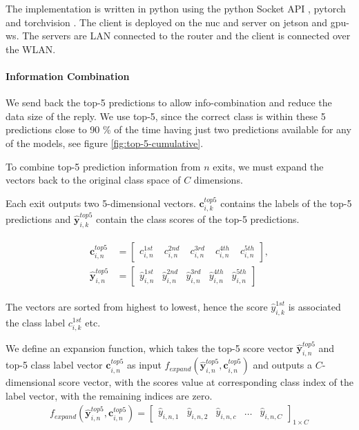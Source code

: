 The implementation is written in \gls{python} using the \gls{python} Socket API \cite{noauthor_socket_nodate}, \gls{pytorch} \cite{paszke_automatic_2017} and \gls{torchvision} \cite{marcel_torchvision_2010}. The client is deployed on the \gls{nuc} and server on \gls{jetson} and \gls{gpu-ws}. The servers are LAN connected to the router and the client is connected over the WLAN.

\paragraph{Information Combination}

We send back the top-5 predictions to allow info-combination and reduce the data size of the reply. We use top-5, since the correct class is within these 5 predictions close to 90 \% of the time having just two predictions available for any of the models, see figure \ref{fig:top-5-cumulative}.

To combine top-5 prediction information from $ n $ exits, we must expand the vectors back to the original class space of $ C $ dimensions.

Each exit outputs two 5-dimensional vectors. $\mathbf{c}_{i,k}^{top5}$ contains the labels of the top-5 predictions and $ \mathbf{\hat{y}}_{i,k}^{top5}$ contain the class scores of the top-5 predictions. 

\begin{align}
\begin{split}
\mathbf{c}_{i,n}^{top5} &= \begin{bmatrix}
c_{i,n}^{1st} & \phantom{.}c_{i,n}^{2nd} & \phantom{.}c_{i,n}^{3rd} & \phantom{.}c_{i,n}^{4th} & \phantom{.}c_{i,n}^{5th}
\end{bmatrix}, \\
\mathbf{\hat{y}}^{top5}_{i,n} &= \begin{bmatrix}
\hat{y}_{i,n}^{1st} & \hat{y}_{i,n}^{2nd} & \hat{y}_{i,n}^{3rd} & \hat{y}_{i,n}^{4th} & \hat{y}_{i,n}^{5th}
\end{bmatrix}
\end{split}
\end{align}

The vectors are sorted from highest to lowest, hence the score $ \hat{y}_{i,k}^{1st} $ is associated the class label $ c_{i,k}^{1st} $ etc. 

We define an expansion function, which takes the top-5 score vector $ \mathbf{\hat{y}}_{i,n}^{top5}$ and top-5 class label vector  $\mathbf{c}_{i,n}^{top5}$ as input  $ f_{expand}\left(\bm{\hat{y}}_{i,n}^{top5},\mathbf{c}_{i,n}^{top5}\right) $ and outputs a $ C $-dimensional score vector, with the scores value at corresponding class index of the label vector, with the remaining indices are zero.
\begin{align}
f_{expand}\left(\bm{\hat{y}}_{i,n}^{top5},\mathbf{c}_{i,n}^{top5}\right) = 
\begin{bmatrix}
\hat{y}_{i,n,1} & \hat{y}_{i,n,2} & \hat{y}_{i,n,c} & \dots & \hat{y}_{i,n,C}
\end{bmatrix}_{1 \times C}
\end{align}


